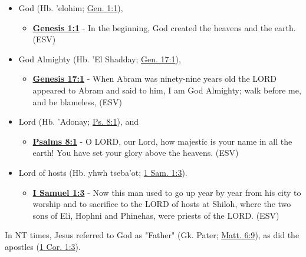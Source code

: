 \documentclass[11pt]{article}
\begin{document}
\begin{itemize}
\item God (Hb. 'elohim; \href{https://www.biblegateway.com/passage/?search=Genesis\%201\%3A1\&version=ESV}{Gen. 1:1}),
\begin{itemize}
\item \textbf{\href{https://www.biblegateway.com/passage/?search=Genesis\%201\%3A1\&version=ESV}{Genesis 1:1}} - In the beginning, God created the heavens and the earth. (ESV)
\end{itemize}
\item God Almighty (Hb. 'El Shadday; \href{https://www.biblegateway.com/passage/?search=Genesis\%2017\%3A1\&version=ESV}{Gen. 17:1}),
\begin{itemize}
\item \textbf{\href{https://www.biblegateway.com/passage/?search=Genesis\%2017\%3A1\&version=ESV}{Genesis 17:1}} - When Abram was ninety-nine years old the LORD appeared to Abram and said to him, I am God Almighty; walk before me, and be blameless, (ESV)
\end{itemize}
\item Lord (Hb. 'Adonay; \href{https://www.biblegateway.com/passage/?search=Psalms\%208\%3A1\&version=ESV}{Ps. 8:1}), and
\begin{itemize}
\item \textbf{\href{https://www.biblegateway.com/passage/?search=Psalms\%208\%3A1\&version=ESV}{Psalms 8:1}} - O LORD, our Lord, how majestic is your name in all the earth! You have set your glory above the heavens. (ESV)
\end{itemize}
\item Lord of hosts (Hb. yhwh tseba'ot; \href{https://www.biblegateway.com/passage/?search=1\%20Samuel\%201\%3A3\&version=ESV}{1 Sam. 1:3}).
\begin{itemize}
\item \textbf{\href{https://www.biblegateway.com/passage/?search=1\%20Samuel\%201\%3A3\&version=ESV}{I Samuel 1:3}} - Now this man used to go up year by year from his city to worship and to sacrifice to the LORD of hosts at Shiloh, where the two sons of Eli, Hophni and Phinehas, were priests of the LORD. (ESV)
\end{itemize}
\end{itemize}

In NT times, Jesus referred to God as "Father" (Gk. Pater; \href{https://www.biblegateway.com/passage/?search=Matthew\%206\%3A9\&version=ESV}{Matt. 6:9}), as did the apostles (\href{https://www.biblegateway.com/passage/?search=1\%20Corinthians\%201\%3A3\&version=ESV}{1 Cor. 1:3}).
\end{document}

